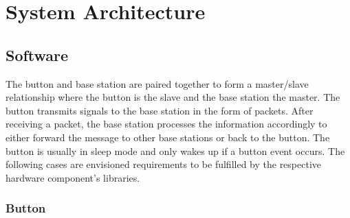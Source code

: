 \documentclass[journal,compsoc]{IEEEtran}
\begin{document}
\section{System Architecture}

\subsection{Software}

The button and base station are paired together to form a master/slave relationship where the button is the slave and the base station the master.  The button transmits signals to the base station in the form of packets.  After receiving a packet, the base station processes the information accordingly to either forward the message to other base stations or back to the button.  The button is usually in sleep mode and only wakes up if a button event occurs.  The following cases are envisioned requirements to be fulfilled by the respective hardware component’s libraries.

\subsubsection{Button}
\end{document}
